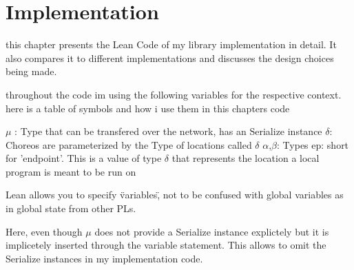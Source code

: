 \chapter{Implementation}
\label{ch:implementation}

this chapter presents the Lean Code of my library implementation in detail. It also compares it to different implementations and discusses the design choices being made.
\par
throughout the code im using the following variables for the respective context.
here is a table of symbols and how i use them in this chapters code

$\mu$ : Type that can be transfered over the network, has an Serialize instance
$\delta$: Choreos are parameterized by the Type of locations called $\delta$
$\alpha$,$\beta$: Types
ep: short for 'endpoint'. This is a value of type $\delta$ that represents the location a local program is meant to be run on

Lean allows you to specify \"variables\", not to be confused with global variables as in global state from other PLs.

Here, even though $\mu$ does not provide a Serialize instance explictely but it is implicetely inserted through the variable statement. This allows to omit the Serialize instances in my implementation code.
%
%
%
%
%
%

